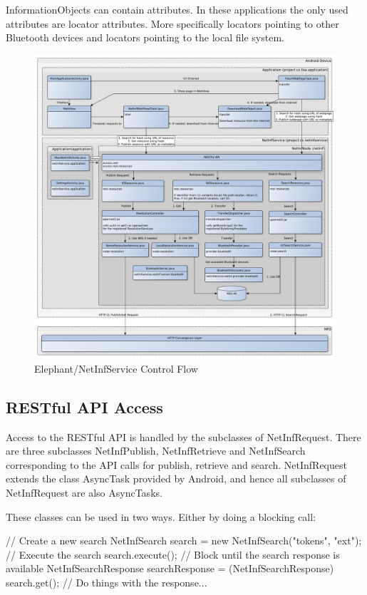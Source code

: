 InformationObjects can contain attributes. In these applications the only used attributes are locator attributes. More specifically locators pointing to other Bluetooth devices and locators pointing to the local file system.

\begin{figure}[h!]
	\centering
		\includegraphics[width=1\textwidth]{./img/flowchart}
    	\caption{Elephant/NetInfService Control Flow}
	\label{fig:controlflow}
\end{figure}

\subsection{RESTful API Access}

Access to the RESTful API is handled by the subclasses of NetInfRequest. There are three subclasses NetInfPublish, NetInfRetrieve and NetInfSearch corresponding to the API calls for publish, retrieve and search. NetInfRequest extends the class AsyncTask provided by Android, and hence all subclasses of NetInfRequest are also AsyncTasks.

These classes can be used in two ways. Either by doing a blocking call:

\begin{code}[language=Java]
	// Create a new search
	NetInfSearch search = new NetInfSearch("tokens", "ext");
	// Execute the search
	search.execute();
	// Block until the search response is available
	NetInfSearchResponse searchResponse =
	        (NetInfSearchResponse) search.get();
	// Do things with the response...
\end{code}

